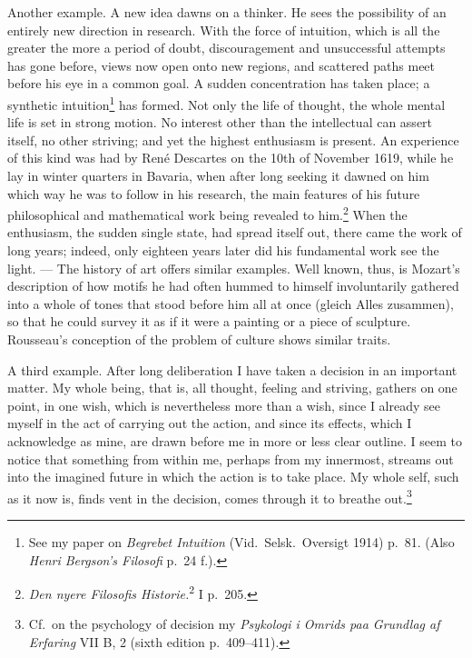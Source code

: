 \documentclass[12pt]{book}
\newcommand{\opage}[1]{\marginnote{\footnotesize\textit{[#1]}}}
\begin{document}
Another example. A new idea dawns on a thinker. He sees the possibility of an
entirely new direction in research. With the force of intuition, which is all
the greater the more a period of doubt, discouragement and unsuccessful attempts
has gone before, views now open onto new regions, and scattered paths meet
before his eye in a common goal. A sudden concentration has taken place; a
synthetic intuition\footnote{See my paper on \textit{Begrebet Intuition} (Vid.\
Selsk.\ Oversigt 1914) p.~81. (Also \textit{Henri Bergson's Filosofi} p.~24 f.).}
has formed. Not only the life of thought, the whole mental life is set in strong
motion. No interest other than the intellectual can assert itself, no other
striving; and yet the highest enthusiasm is present. An experience of this kind
was had by René Descartes on the 10th of November 1619, while he lay in winter
quarters in Bavaria, when after long seeking it dawned on him which way he was
to follow in his research, the main features of his future philosophical and
mathematical work being revealed to him.\footnote{\textit{Den nyere Filosofis
Historie.}\textsuperscript{2} I p.~205.} When the enthusiasm, the sudden single
state, had spread itself out, there came the work of long years; indeed, only
eighteen years later did his fundamental work see the light. --- The history of
art offers similar examples. Well known, thus, is Mozart's description of how
motifs he had often hummed to himself involuntarily gathered into a whole of
tones that stood before him all at once (gleich Alles zusammen), so that he
\opage{10}could survey it as if it were a painting or a piece of sculpture.
Rousseau's conception of the problem of culture shows similar traits.

A third example. After long deliberation I have taken a decision in an
important matter. My whole being, that is, all thought, feeling and striving,
gathers on one point, in one wish, which is nevertheless more than a wish, since
I already see myself in the act of carrying out the action, and since its
effects, which I acknowledge as mine, are drawn before me in more or less clear
outline. I seem to notice that something from within me, perhaps from my
innermost, streams out into the imagined future in which the action is to take
place. My whole self, such as it now is, finds vent in the decision, comes
through it to breathe out.\footnote{Cf.\ on the psychology of decision my
\textit{Psykologi i Omrids paa Grundlag af Erfaring} VII B, 2 (sixth edition
p.~409--411).}
\end{document}
